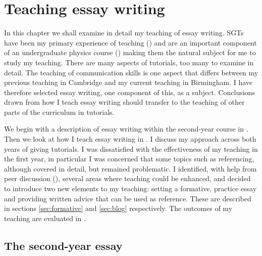 \chapter{Teaching essay writing}\label{ch:essay}

In this chapter we shall examine in detail my teaching of essay writing. SGTs have been my primary experience of teaching () and are an important component of an undergraduate physics course () making them the natural subject for me to study my teaching. There are many aspects of tutorials, too many to examine in detail. The teaching of communication skills is one aspect that differs between my previous teaching in Cambridge and my current teaching in Birmingham. I have therefore selected essay writing, one component of this, as a subject. Conclusions drawn from how I teach essay writing should transfer to the teaching of other parts of the curriculum in tutorials.

We begin with a description of essay writing within the second-year course in . Then we look at how I teach essay writing in . I discuss my approach across both years of giving tutorials. I was dissatisfied with the effectiveness of my teaching in the first year, in particular I was concerned that some topics such as referencing, although covered in detail, but remained problematic. I identified, with help from peer discussion (), several areas where teaching could be enhanced, and decided to introduce two new elements to my teaching: setting a formative, practice essay and providing written advice that can be used as reference. These are described in sections \ref{sec:formative} and \ref{sec:blog} respectively. The outcomes of my teaching are evaluated in .

\section{The second-year essay}\label{sec:problem}

